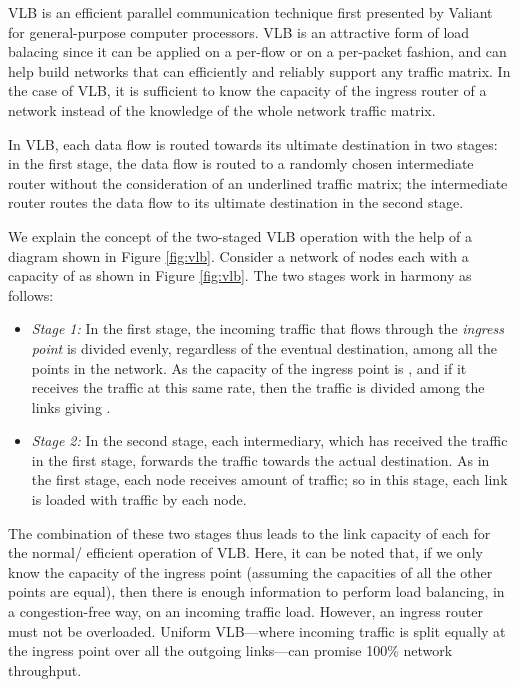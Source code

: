 \documentclass[10pt]{IEEEtran}
\begin{document}
VLB is an efficient parallel communication technique first presented by Valiant \cite{valiant1982scheme, valiant1981universal, Valiant1990} for general-purpose computer processors. VLB is an attractive form of load balacing since it can be applied on a per-flow or on a per-packet fashion, and can help build networks that can efficiently and reliably support any traffic matrix. In the case of VLB, it is sufficient to know the capacity of the ingress router of a network instead of the knowledge of the whole network traffic matrix. 

In VLB, each data flow is routed towards its ultimate destination in two stages: in the first stage, the data flow is routed to a randomly chosen intermediate router without the consideration of an underlined traffic matrix; the intermediate router routes the data flow to its ultimate destination in the second stage.

We explain the concept of the two-staged VLB operation with the help of a diagram shown in Figure \ref{fig:vlb}. Consider a network of  nodes each with a capacity of  as shown in Figure \ref{fig:vlb}. The two stages work in harmony as follows:

\begin{itemize}

\vspace{1mm}
\item{\textit{Stage 1:}} In the first stage, the incoming traffic that flows through the \textit{ingress point} is divided evenly, regardless of the eventual destination, among all the points in the network. As the capacity of the ingress point is , and if it receives the traffic at this same rate, then the traffic is divided among the links giving .

\vspace{1mm}
\item{\textit{Stage 2:}} In the second stage, each intermediary, which has received the traffic in the first stage, forwards the traffic towards the actual destination. As in the first stage, each node receives  amount of traffic; so in this stage, each link is loaded with  traffic by each node.

\end{itemize}

The combination of these two stages thus leads to the link capacity of  each for the normal/ efficient operation of VLB. Here, it can be noted that, if we only know the capacity of the ingress point (assuming the capacities of all the other points are equal), then there is enough information to perform load balancing, in a congestion-free way, on an incoming traffic load. However, an ingress router must not be overloaded. Uniform VLB---where incoming traffic is split equally at the ingress point over all the outgoing links---can promise 100\% network throughput. 
\end{document}
